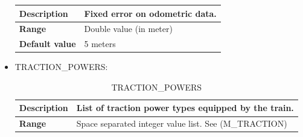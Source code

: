 \documentclass{template/openetcs}
\begin{document}
\begin{itemize}
\begin{longtable}{|l|l|}
					\begin{minipage}[t]{0.22\linewidth} \textbf{Description}	\end{minipage} 
				&	\begin{minipage}[t]{0.78\linewidth} Fixed error on odometric data. \end{minipage} \\
				
				\hline
																																									
					\begin{minipage}[t]{0.22\linewidth} \textbf{Range}	\end{minipage} 
				&	\begin{minipage}[t]{0.78\linewidth} Double value (in meter) \end{minipage} \\
				
				\hline
				
					\begin{minipage}[t]{0.22\linewidth} \textbf{Default value}	\end{minipage} 
				&	\begin{minipage}[t]{0.78\linewidth} 5 meters \end{minipage} \\
				
				\hline
				
			\end{longtable}
							
		\item TRACTION\_POWERS:
																															
			\begin{longtable}{|l|l|}
				\caption{TRACTION\_POWERS}\\ 
				\hline
				
					\begin{minipage}[t]{0.22\linewidth} \textbf{Description}	\end{minipage} 
				&	\begin{minipage}[t]{0.78\linewidth} List of traction power types equipped by the train. \end{minipage} \\
				
				\hline
																																									
					\begin{minipage}[t]{0.22\linewidth} \textbf{Range}	\end{minipage} 
				&	\begin{minipage}[t]{0.78\linewidth} Space separated integer value list. See (M\_TRACTION) \end{minipage} \\
				

\end{longtable}
\end{itemize}
\end{document}
